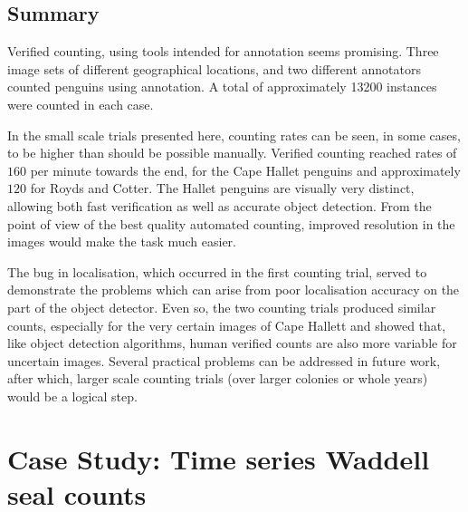 \subsection{Summary}
\label{sec:penguin_conclusion}

Verified counting, using tools intended for annotation seems promising. Three image sets of different geographical locations, and two different annotators counted penguins using annotation. A total of approximately 13200 instances were counted in each case.

In the small scale trials presented here, counting rates can be seen, in some cases, to be higher than should be possible manually. Verified counting reached rates of $160$ per minute towards the end, for the Cape Hallet penguins and approximately $120$ for Royds and Cotter. The Hallet penguins are visually very distinct, allowing both fast verification as well as accurate object detection. From the point of view of the best quality automated counting, improved resolution in the images would make the task much easier. 

The bug in localisation, which occurred in the first counting trial, served to demonstrate the problems which can arise from poor localisation accuracy on the part of the object detector. Even so, the two counting trials produced similar counts, especially for the very certain images of Cape Hallett and showed that, like object detection algorithms, human verified counts are also more variable for uncertain images. Several practical problems can be addressed in future work, after which, larger scale counting trials (over larger colonies or whole years) would be a logical step.

\section{Case Study: Time series Waddell seal counts \texorpdfstring{\cite{Eisert2015, Eisert2019}}{}}
\label{sec:case_seals}




